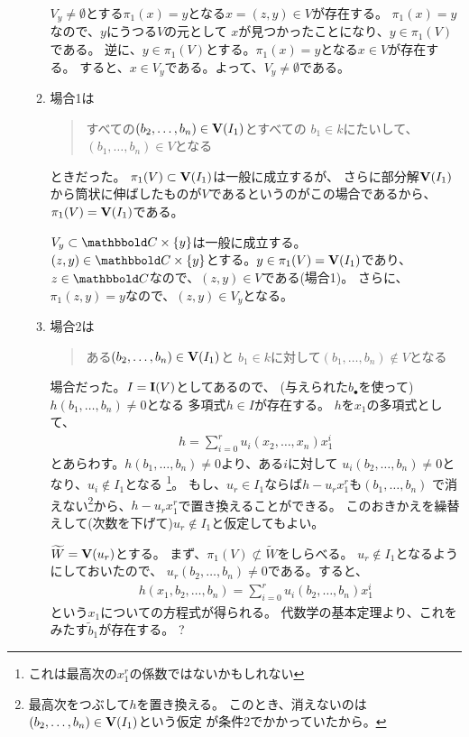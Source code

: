 \begin{enumerate}[label=(\arabic*)]
\begin{enumerate}[label=(\alph*)]
    $V_y\neq \emptyset$とする$\pi_1(x)=y$となる$x=(z,y) \in V$が存在する。
    $\pi_1(x) = y$なので、$y$にうつる$V$の元として
    $x$が見つかったことになり、$y \in\pi_1(V)$である。
    逆に、$y\in \pi_1(V)$とする。$\pi_1(x) = y$となる$x\in V$が存在する。
    すると、$x\in V_y$である。よって、$V_y \neq \emptyset$である。
    \item
    場合1は
    \begin{quote}
      すべての$(b_2,\dots,b_n)\in \textbf V(I_1)$とすべての
      $b_1 \in k$にたいして、$(b_1,\dots,b_n) \in V$となる
    \end{quote}
    ときだった。
    $\pi_1(V)\subset \textbf V(I_1)$は一般に成立するが、
    さらに部分解$\textbf V(I_1)$から筒状に伸ばしたものが$V$であるというのがこの場合であるから、
    $\pi_1(V) = \textbf V(I_1)$である。

    $V_y \subset \C \times \set{y}$は一般に成立する。
    $(z,y)\in \C \times \set{y}$とする。$y\in \pi_1(V)=\textbf V(I_1)$であり、
    $z\in \C$なので、$(z,y)\in V$である(場合1)。
    さらに、$\pi_1(z,y)  = y$なので、$(z,y) \in V_y$となる。
    \item
    場合2は
    \begin{quote}
      ある$(b_2,\dots,b_n) \in \textbf V(I_1)$と
      $b_1 \in k$に対して$(b_1,\dots,b_n) \notin V$となる
    \end{quote}
    場合だった。$I=\textbf I(V)$としてあるので、
    (与えられた$b_\bullet$を使って)$h(b_1,\dots,b_n)\neq 0$となる
    多項式$h\in I$が存在する。
    $h$を$x_1$の多項式として、
    \begin{align}
      h=\sum_{i=0}^r u_i(x_2,\dots,x_n)x_1^i
    \end{align}
    とあらわす。$h(b_1,\dots,b_n)\neq 0$より、ある$i$に対して
    $u_i(b_2,\dots,b_n)\neq 0$となり、$u_i \notin I_1$となる
    \footnote{これは最高次の$x_1^r$の係数ではないかもしれない}。
    もし、$u_r \in I_1$ならば$h-u_r x_1^r$も$(b_1,\dots,b_n)$
    で消えない\footnote{最高次をつぶして$h$を置き換える。
    このとき、消えないのは$(b_2,\dots,b_n)\in \textbf V(I_1)$という仮定
    が条件2でかかっていたから。}から、$h-u_r x_1^r$で置き換えることができる。
    このおきかえを繰替えして(次数を下げて)$u_r \notin I_1$と仮定してもよい。

    $\widetilde W = \textbf V(u_r)$とする。
    まず、$\pi_1(V) \not\subset \tilde W$をしらべる。
    $u_r \notin I_1$となるようにしておいたので、
    $u_r(b_2,\dots,b_n) \neq 0$である。すると、
    \begin{align}
      h(x_1,b_2,\dots,b_n) = \sum_{i=0}^r u_i(b_2,\dots,b_n)x_1^i
    \end{align}
    という$x_1$についての方程式が得られる。
    代数学の基本定理より、これをみたす$\tilde b_1$が存在する。
    ?


\end{enumerate}
\end{enumerate}
